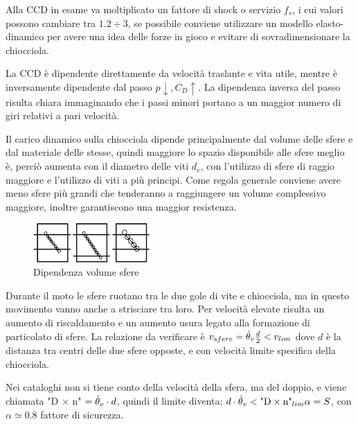 Alla CCD in esame va moltiplicato un fattore di shock o servizio \( f_s \), i cui valori possono cambiare tra \( 1.2 \div 3 \), se possibile conviene utilizzare un modello elasto-dinamico per avere una idea delle forze in gioco e evitare di sovradimensionare la chiocciola.

La CCD è dipendente direttamente da velocità traslante e vita utile, mentre è inversamente dipendente dal passo \( p \downarrow, C_D \uparrow\). La dipendenza inversa del passo risulta chiara immaginando che i passi minori portano a un maggior numero di giri relativi a pari velocità.

Il carico dinamico sulla chiocciola dipende principalmente dal volume delle sfere e dal materiale delle stesse, quindi maggiore lo spazio disponibile alle sfere meglio è, perciò aumenta con il diametro delle viti \(d_v\), con l'utilizzo di sfere di raggio maggiore e l'utilizzo di viti a più principi.
Come regola generale conviene avere meno sfere più grandi che tenderanno a raggiungere un volume complessivo maggiore, inoltre garantiscono una maggior resistenza.

\begin{figure}[h]
    \centering
    \includegraphics[width=0.4\textwidth]{Immagini/CCD_chiocciola_sfere.png}
    \caption{Dipendenza volume sfere}
\end{figure}

Durante il moto le sfere ruotano tra le due gole di vite e chiocciola, ma in questo movimento vanno anche a strisciare tra loro. Per velocità elevate risulta un aumento di riscaldamento e un aumento usura legato alla formazione di particolato di sfere.
La relazione da verificare è \( v_{sfere} = \dot{\theta}_v \frac{d}{2} < v_{lim} \) dove \(d\) è la distanza tra centri delle due sfere opposte, e con velocità limite specifica della chiocciola.

Nei cataloghi non si tiene conto della velocità della sfera, ma del doppio, e viene chiamata "D \(\times\) n" \(= \dot{\theta}_v\cdot d \), quindi  il limite diventa: \(d \cdot \dot{\theta}_v < \text{"D}\times \text{n"}_{lim} \alpha = S \), con \(\alpha\simeq 0.8\) fattore di sicurezza.


